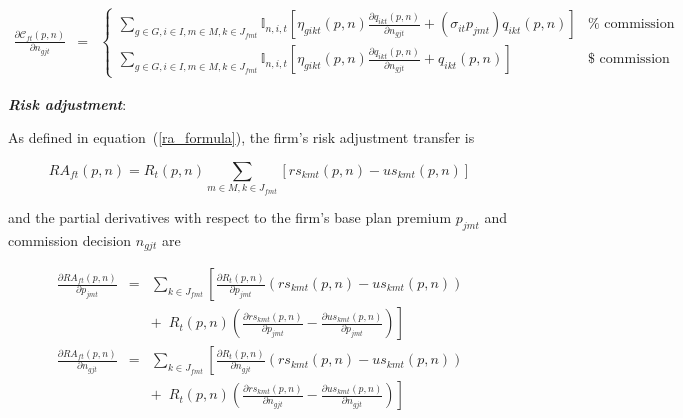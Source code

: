 \documentclass[12pt]{article}
\begin{document}
		
	
	
\vspace{-0.4in}
	\singlespacing	

		 \begin{eqnarray*}
	\frac{\partial \mathcal{C}_{ft}(\textit{p},\textit{n})}{\partial n_{gjt}} &=& \begin{cases} 
		\sum_{g \in G, i \in I, m \in M, k \in J_{fmt}} \mathbb{I}_{n,i,t} \left[\eta_{gikt}(\textit{p},\textit{n}) \frac{\partial q_{ikt}(\textit{p},\textit{n})}{\partial n_{gjt}} +  \left(\sigma_{it} p_{jmt} \right) q_{ikt}(\textit{p},\textit{n})   \right]   & \mathrm{\% \,\, commission} \\		
		\sum_{g \in G, i \in I, m \in M, k \in J_{fmt}} \mathbb{I}_{n,i,t} \left[\eta_{gikt}(\textit{p},\textit{n}) \frac{\partial q_{ikt}(\textit{p},\textit{n})}{\partial n_{gjt}} + q_{ikt}(\textit{p},\textit{n})  \right]  & \mathrm{\$ \,\, commission}
   \end{cases}
	\end{eqnarray*}
				
		\doublespacing
						
	
	
\noindent \textit{\bf Risk adjustment}:
	
\noindent As defined in equation~(\ref{ra_formula}), the firm's risk adjustment transfer is	
	
	\vspace{-0.3in}		
		
	$$
	RA_{ft}(\textit{p},\textit{n}) =  R_t(\textit{p},\textit{n}) \sum_{m \in M, k \in J_{fmt}} \left[ rs_{kmt}(\textit{p},\textit{n}) - us_{kmt}(\textit{p},\textit{n})  \right]
	$$		
			
\noindent and the partial derivatives with respect to the firm's base plan premium $p_{jmt}$ and commission decision $n_{gjt}$ are 			
		
		\vspace{-0.4in}		
	
		\begin{eqnarray*}
		\frac{\partial RA_{ft}(\textit{p},\textit{n})}{\partial p_{jmt}} &=& \sum_{k \in J_{fmt}}  \left[\frac{\partial R_t(\textit{p},\textit{n})}{\partial p_{jmt}}\left( rs_{kmt}(\textit{p},\textit{n}) - us_{kmt}(\textit{p},\textit{n})  \right) \right. \nonumber \\ && \left. + \,\,\,  R_t(\textit{p},\textit{n}) \left( \frac{\partial rs_{kmt}(\textit{p},\textit{n})}{\partial p_{jmt}} - \frac{\partial  us_{kmt}(\textit{p},\textit{n})}{\partial p_{jmt}} \right) \right] \\
		\frac{\partial RA_{ft}(\textit{p},\textit{n})}{\partial n_{gjt}} &=& \sum_{k \in J_{fmt}}  \left[\frac{\partial R_t(\textit{p},\textit{n})}{\partial n_{gjt}}\left( rs_{kmt}(\textit{p},\textit{n}) - us_{kmt}(\textit{p},\textit{n})  \right) \right. \nonumber \\ && \left. + \,\,\,  R_t(\textit{p},\textit{n}) \left( \frac{\partial rs_{kmt}(\textit{p},\textit{n})}{\partial n_{gjt}} - \frac{\partial  us_{kmt}(\textit{p},\textit{n})}{\partial n_{gjt}} \right) \right]
		\end{eqnarray*}
\end{document}

